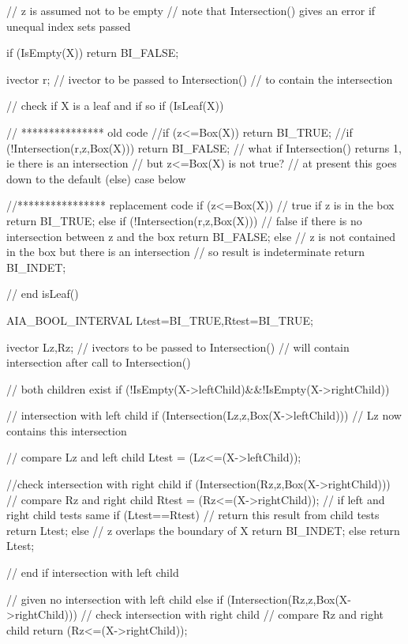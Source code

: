 \begin{DoxyCode}
{
  // z is assumed not to be empty
  // note that Intersection() gives an error if unequal index sets passed

  if (IsEmpty(X)) return BI_FALSE;

  ivector r;        // ivector to be passed to Intersection()
  // to contain the intersection

  // check if X is a leaf and if so
  if (IsLeaf(X))
  {
    // *************** old code
    //if (z<=Box(X)) return BI_TRUE;
    //if (!Intersection(r,z,Box(X))) return BI_FALSE;
    // what if Intersection() returns 1, ie there is an intersection
    // but z<=Box(X) is not true?
    // at present this goes down to the default (else) case below

    //**************** replacement code
    if (z<=Box(X))
                    // true if z is in the box
        return BI_TRUE;
    else if (!Intersection(r,z,Box(X)))
                    // false if there is no intersection between z and the box
        return BI_FALSE;
    else          // z is not contained in the box but there is an intersection
                  // so result is indeterminate
        return BI_INDET;
  }                 // end isLeaf()

  AIA_BOOL_INTERVAL Ltest=BI_TRUE,Rtest=BI_TRUE;

  ivector Lz,Rz;    // ivectors to be passed to Intersection()
  // will contain intersection after call to Intersection()

                    // both children exist
  if (!IsEmpty(X->leftChild)&&!IsEmpty(X->rightChild))
  {

                    // intersection with left child
    if (Intersection(Lz,z,Box(X->leftChild)))
      // Lz now contains this intersection
    {
                    // compare Lz and left child
      Ltest = (Lz<=(X->leftChild));

                    //check intersection with right child
      if (Intersection(Rz,z,Box(X->rightChild)))
      {
                    // compare Rz and right child
        Rtest = (Rz<=(X->rightChild));
                    // if left and right child tests same
        if (Ltest==Rtest)
                    // return this result from child tests
          return Ltest;
        else
                    // z overlaps the boundary of X
          return BI_INDET;
      }
      else
        return Ltest;
    }               // end if intersection with left child

                    // given no intersection with left child
    else if (Intersection(Rz,z,Box(X->rightChild)))
                    // check intersection with right child
                    // compare Rz and right child
      return (Rz<=(X->rightChild));

}}
\end{DoxyCode}
